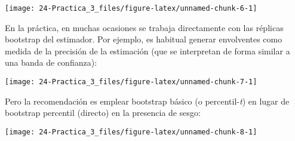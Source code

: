 \documentclass[
]{book}
\newenvironment{Shaded}{\begin{snugshade}}{\end{snugshade}}
\newcommand{\DataTypeTok}[1]{\textcolor[rgb]{0.13,0.29,0.53}{#1}}
\newcommand{\DecValTok}[1]{\textcolor[rgb]{0.00,0.00,0.81}{#1}}
\newcommand{\KeywordTok}[1]{\textcolor[rgb]{0.13,0.29,0.53}{\textbf{#1}}}
\newcommand{\NormalTok}[1]{#1}
\newcommand{\OperatorTok}[1]{\textcolor[rgb]{0.81,0.36,0.00}{\textbf{#1}}}
\newcommand{\StringTok}[1]{\textcolor[rgb]{0.31,0.60,0.02}{#1}}
\theoremstyle{definition}
\theoremstyle{definition}
\theoremstyle{definition}
\theoremstyle{remark}
\begin{document}
\begin{center}\texttt{[image: 24-Practica\_3\_files/figure-latex/unnamed-chunk-6-1]} \end{center}

En la práctica, en muchas ocasiones se trabaja directamente con
las réplicas bootstrap del estimador. Por ejemplo, es habitual
generar envolventes como medida de la precisión de la estimación
(que se interpretan de forma similar a una banda de confianza):

\begin{Shaded}
\end{Shaded}

\begin{center}\texttt{[image: 24-Practica\_3\_files/figure-latex/unnamed-chunk-7-1]} \end{center}

Pero la recomendación es emplear bootstrap básico (o percentil-\emph{t}) en lugar
de bootstrap percentil (directo) en la presencia de sesgo:

\begin{Shaded}
\end{Shaded}

\begin{center}\texttt{[image: 24-Practica\_3\_files/figure-latex/unnamed-chunk-8-1]} \end{center}
\end{document}
